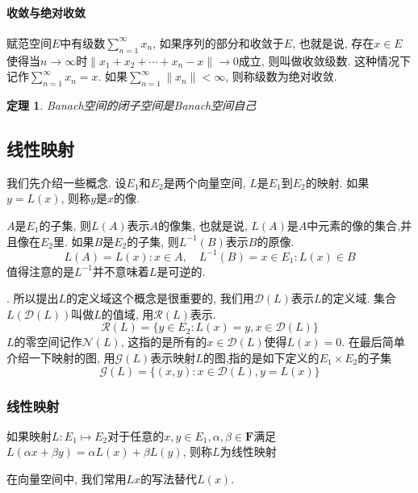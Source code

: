 \documentclass[a4paper,11pt]{article}
\theoremstyle{mystyle}
\newtheorem{theorem}{\hspace{2em}定理}[section]
\begin{document}
\paragraph*{收敛与绝对收敛}
\begin{definition}
  赋范空间$E$中有级数$\sum_{n=1}^{\infty}x_n$, 如果序列的部分和收敛于$E$, 也就是说, 存在$x\in E$使得当$n\to\infty$时$\|x_1+x_2+\cdots+x_n-x\|\to0$成立, 则叫做收敛级数. 这种情况下记作$\sum_{n=1}^{\infty}x_n=x$. 如果$\sum_{n=1}^{\infty}\|x_n\|<\infty$, 则称级数为绝对收敛.
\end{definition}
\begin{theorem}
  Banach空间的闭子空间是Banach空间自己
\end{theorem}
\subsection{线性映射}
我们先介绍一些概念. 设$E_1$和$E_2$是两个向量空间, $L$是$E_1$到$E_2$的映射. 如果$y=L(x)$, 则称$y$是$x$的像.

$A$是$E_1$的子集, 则$L(A)$表示$A$的像集, 也就是说, $L(A)$是$A$中元素的像的集合,并且像在$E_2$里. 如果$B$是$E_2$的子集, 则$L^{-1}(B)$表示$B$的原像.
\begin{equation*}
  L(A)={L(x):x\in A},\quad L^{-1}(B)={x\in E_1:L(x)\in B}
\end{equation*}
值得注意的是$L^{-1}$并不意味着$L$是可逆的.

. 所以提出$L$的定义域这个概念是很重要的, 我们用$\mathcal{D}(L)$表示$L$的定义域. 集合$L(\mathcal{D}(L))$叫做$L$的值域, 用$\mathcal{R}(L)$表示.
\begin{equation*}
  \mathcal{R}(L)=\{y\in E_2:L(x)=y,x\in\mathcal{D}(L)\}
\end{equation*}
$L$的零空间记作$\mathcal{N}(L)$, 这指的是所有的$x\in \mathcal{D}(L)$使得$L(x)=0$. 在最后简单介绍一下映射的图, 用$\mathcal{G}(L)$表示映射$L$的图,指的是如下定义的$E_1\times E_2$的子集
\begin{equation*}
  \mathcal{G}(L)=\{(x,y):x\in\mathcal{D}(L),y=L(x)\}
\end{equation*}
\subsubsection*{线性映射}
\begin{definition}
  如果映射$L:E_1\mapsto E_2$对于任意的$x,y\in E_1,\alpha,\beta\in \mathbf{F}$满足$L(\alpha x+\beta y)=\alpha L(x)+\beta L(y)$, 则称$L$为线性映射
\end{definition}
在向量空间中, 我们常用$Lx$的写法替代$L(x)$.
\end{document}
